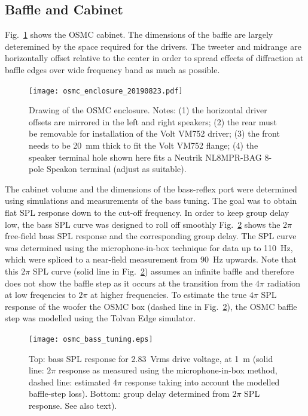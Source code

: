 \documentclass[12pt,a4paper]{article}
\providecommand{\figr}[1]{Fig.~\ref{fig:#1}}
\providecommand{\figlabel}[1]{\label{fig:#1}}
\begin{document}
\subsection{Baffle and Cabinet}

\figr{osmc_enclosure} shows the OSMC cabinet. The dimensions of the baffle are largely deteremined by the space required for the drivers. The tweeter and midrange are horizontally offset relative to the center in order to spread effects of diffraction at baffle edges over wide frequency band as much as possible.

\begin{figure}[tbp]
	\centering
	\texttt{[image: osmc\_enclosure\_20190823.pdf]}
	\caption{Drawing of the OSMC enclosure. Notes: (1) the horizontal driver offsets are mirrored in the left and right speakers; (2) the rear must be removable for installation of the Volt VM752 driver; (3) the front needs to be \SI{20}{mm} thick to fit the Volt VM752 flange; (4) the speaker terminal hole shown here fits a Neutrik NL8MPR-BAG 8-pole Speakon terminal (adjust as suitable).}
	\figlabel{osmc_enclosure}
\end{figure}

The cabinet volume and the dimensions of the bass-reflex port were determined using simulations and measurements of the bass tuning. The goal was to obtain flat SPL response down to the cut-off frequency. In order to keep group delay low, the bass SPL curve was designed to roll off smoothly \figr{osmc_bass_tuning} shows the $2\pi$ free-field bass SPL response and the corresponding group delay. The SPL curve was determined using the microphone-in-box technique\cite{Small_inbox} for data up to \SI{110}{Hz}, which were spliced to a near-field measurement from \SI{90}{Hz} upwards. Note that this $2\pi$ SPL curve (solid line in \figr{osmc_bass_tuning}) assumes an infinite baffle and therefore does not show the baffle step as it occurs at the transition from the $4\pi$ radiation at low freqencies to $2\pi$ at higher frequencies. To estimate the true $4\pi$ SPL response of the woofer the OSMC box (dashed line in \figr{osmc_bass_tuning}), the OSMC baffle step was modelled using the Tolvan Edge simulator.

\begin{figure}[tb]
	\centering
	\texttt{[image: osmc\_bass\_tuning.eps]}
	\caption{Top: bass SPL response for \SI{2.83}{Vrms} drive voltage, at \SI{1}{m} (solid line: $2\pi$ response as measured using the microphone-in-box method\cite{Small_inbox}, dashed line: estimated $4\pi$ response taking into account the modelled baffle-step loss). Bottom: group delay determined from $2\pi$ SPL response. See also text).}
	\figlabel{osmc_bass_tuning}
\end{figure}
\end{document}
